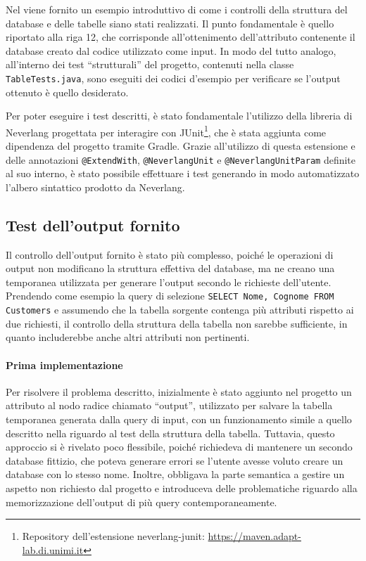 \documentclass[12pt,a4paper,openright,twoside]{book}
\begin{document}
Nel  viene fornito un esempio introduttivo di come i controlli della struttura del database e delle tabelle 
siano stati realizzati. Il punto fondamentale è quello riportato alla riga 12, che corrisponde all’ottenimento dell’attributo 
contenente il database creato dal codice utilizzato come input. In modo del tutto analogo, all’interno dei test “strutturali” del 
progetto, contenuti nella classe \texttt{TableTests.java}, sono eseguiti dei codici d’esempio per verificare se l’output ottenuto 
è quello desiderato.



Per poter eseguire i test descritti, è stato fondamentale l’utilizzo della libreria di Neverlang progettata per interagire con 
JUnit\footnote{Repository dell’estensione neverlang-junit: \href{https://maven.adapt-lab.di.unimi.it/\#/neverlang/releases/it/unimi/di/adaptlab/neverlang-junit-extension}{https://maven.adapt-lab.di.unimi.it}}, 
che è stata aggiunta come dipendenza del progetto tramite Gradle. Grazie all’utilizzo di questa estensione e delle annotazioni 
\texttt{@ExtendWith}, \texttt{@NeverlangUnit} e \texttt{@NeverlangUnitParam} definite al suo interno, è stato possibile effettuare 
i test generando in modo automatizzato l’albero sintattico prodotto da Neverlang.

\subsection{Test dell’output fornito}
Il controllo dell’output fornito è stato più complesso, poiché le operazioni di output non modificano la struttura effettiva del 
database, ma ne creano una temporanea utilizzata per generare l’output secondo le richieste dell’utente. Prendendo come esempio la 
query di selezione \texttt{SELECT Nome, Cognome FROM Customers} e assumendo che la tabella sorgente contenga più attributi 
rispetto ai due richiesti, il controllo della struttura della tabella non sarebbe sufficiente, in quanto includerebbe anche altri 
attributi non pertinenti.

\paragraph{Prima implementazione}
Per risolvere il problema descritto, inizialmente è stato aggiunto nel progetto un attributo al nodo radice chiamato “output”, 
utilizzato per salvare la tabella temporanea generata dalla query di input, con un funzionamento simile a quello descritto nella 
 riguardo al test della struttura della tabella. Tuttavia, questo approccio si è rivelato poco flessibile, 
poiché richiedeva di mantenere un secondo database fittizio, che poteva generare errori se l’utente avesse voluto creare un database 
con lo stesso nome. Inoltre, obbligava la parte semantica a gestire un aspetto non richiesto dal progetto e introduceva delle 
problematiche riguardo alla memorizzazione dell’output di più query contemporaneamente.
\end{document}
